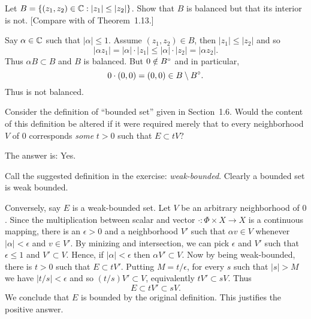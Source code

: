 \begin{enumerate}
\begin{itemize}
\end{itemize}


\begin{excopy}
Let \(B=\{(z_1,z_2)\in\mathbb{C}: |z_1|\leq|z_2|\}\).
Show that $B$ is balanced but that its interior is not.
[Compare with  of Theorem~1.13.]
\end{excopy}

Say \(\alpha\in \mathbb{C}\) such that \(|\alpha|\leq 1\).
Assume \((z_1,z_2)\in B\), then \(|z_1|\leq|z_2|\) and 
so 
\begin{equation*}
 |\alpha z_1| = |\alpha|\cdot|z_1| \leq
 |\alpha|\cdot|z_2| = |\alpha z_2|.
\end{equation*}
Thus \(\alpha B \subset B\) and $B$ is balanced.
But \(0\notin B^{\circ}\) and in particular,
\begin{equation*}
0\cdot(0,0) = (0,0) \in B \setminus B^{\circ}.
\end{equation*}
Thus  is not balanced.

\begin{excopy}
Consider the definition of 
``bounded set'' given in Section~1.6.
Would the content of this definition be altered if it were required merely
that to every neighborhood $V$ of $0$
corresponds \emph{some} \(t>0\) such that \(E \subset tV\)?
\end{excopy}

The answer is: Yes.

Call the suggested definition in the exercise: \emph{weak-bounded}.
Clearly a bounded set is weak bounded.

Conversely, say $E$ is a weak-bounded set.
Let $V$ be an arbitrary neighborhood of $0$.
Since the multiplication between scalar and vector 
\(\cdot:\Phi\times X\rightarrow X\) is a continuous mapping,
there is an \(\epsilon > 0\) and a neighborhood $V'$ 
such that \(\alpha v \in V\) %
whenever \(|\alpha| < \epsilon\) and \(v\in V'\).
By minizing and intersection, we can pick \(\epsilon\) and $V'$
such that \(\epsilon \leq 1\) and \(V' \subset V\).
Hence, if \(|\alpha|< \epsilon\) then  \(\alpha V' \subset V\).
Now by being weak-bounded, there is \(t>0\) such that \(E \subset tV'\).
Putting \(M = t/\epsilon\), for every $s$ such that
\(|s| > M\) we have \(|t/s| < \epsilon\) and so 
\((t/s)V' \subset V\), equivalently 
\(tV' \subset sV\). Thus
\begin{equation*}
E \subset tV' \subset sV.
\end{equation*}
We conclude that $E$ is bounded by the original definition.
This justifies the positive answer.


\end{enumerate}
